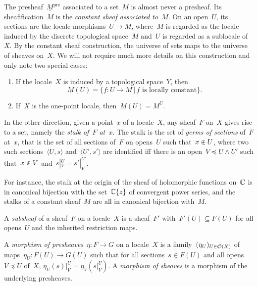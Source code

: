 \documentclass{ws-rv9x6}
\begin{document}
{\label{par:constant-sheaf}%
The presheaf~$\underline{M}^\mathrm{pre}$ associated to a set~$M$ is almost
never a presheaf. Its sheafification~$\underline{M}$ is the \emph{constant sheaf associated
to~$M$}\label{page:constant-sheaf}. On an open~$U$, its sections are the locale
morphisms~$U \to M$, where~$M$ is regarded as the locale induced by
the discrete topological space~$M$ and~$U$ is regarded as a sublocale of~$X$.
By the constant sheaf construction, the universe of sets maps to the universe
of sheaves on~$X$. We will not require much more details on this construction
and only note two special cases:
\begin{enumerate}
\item If the locale~$X$ is induced by a topological space~$Y$, then
\[ \underline{M}(U) = \{ f : U \to M \,|\, \text{$f$ is locally constant} \}. \]
\item If~$X$ is the one-point locale, then~$\underline{M}(U) = M^U$.
\end{enumerate}

In the other direction, given a point~$x$ of a locale~$X$, any sheaf~$F$ on~$X$ gives
rise to a set, namely the \emph{stalk of~$F$ at~$x$}. The stalk is the set of
\emph{germs of sections} of~$F$ at~$x$, that is the set of all sections of~$F$
on opens~$U$ such that~$x \inplus U$, where two such sections~$\langle U,s
\rangle$ and~$\langle U',s' \rangle$ are identified iff there is an open~$V
\preceq U \wedge U'$ such that~$x \inplus V$ and~$s|^U_V = s'|^{U'}_V$.

For instance, the stalk at the origin of the sheaf of holomorphic functions
on~$\mathbb{C}$ is in canonical bijection with the set~$\mathbb{C}\{z\}$ of convergent power
series, and the stalks of a constant sheaf~$\underline{M}$ are all in canonical
bijection with~$M$.

\begin{definition}A \emph{subsheaf} of a sheaf~$F$ on a locale~$X$ is a
sheaf~$F'$ with~$F'(U) \subseteq F(U)$ for all opens~$U$ and the inherited
restriction maps.\end{definition}

\begin{definition}A \emph{morphism of presheaves}~$\eta : F \to G$ on a
locale~$X$ is a family~$(\eta_U)_{U \in \mathcal{O}(X)}$ of maps~$\eta_U : F(U) \to
G(U)$ such that for all sections~$s \in F(U)$ and all opens~$V \preceq U$
of~$X$, $\eta_U(s)|^U_V = \eta_V(s|^U_V)$. A \emph{morphism of sheaves} is a
morphism of the underlying presheaves.
\end{definition}


}
\end{document}

